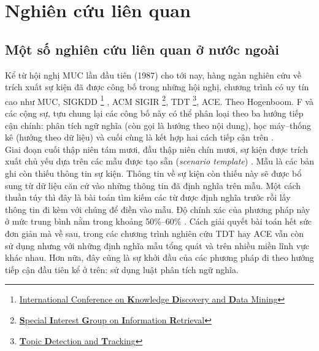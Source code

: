 \section{Nghiên cứu liên quan}
	\subsection{Một số nghiên cứu liên quan ở nước ngoài}
\noindent Kể từ hội nghị MUC lần đầu tiên (1987) cho tới nay, hàng ngàn nghiên cứu về trích xuất sự kiện đã được công bố trong những  hội nghị, chương trình có uy tín cao như MUC, SIGKDD \footnote{\href{http://www.kdd.org/}{International Conference on \textbf{K}nowledge \textbf{D}iscovery and \textbf{D}ata Mining}} , ACM SIGIR \footnote{\href{http://www.sigir.org/}{\textbf{S}pecial \textbf{I}nterest \textbf{G}roup on \textbf{I}nformation \textbf{R}etrieval}}, TDT \footnote{\href{http://projects.ldc.upenn.edu/TDT/}{\textbf{T}opic \textbf{D}etection and \textbf{T}racking}}, ACE. Theo Hogenboom. F và các cộng sự, tựu chung lại các công bố này có thể phân loại theo ba hướng tiếp cận chính: phân tích ngữ nghĩa (còn gọi là hướng theo nội dung), học máy--thống kê (hướng theo dữ liệu) và cuối cùng là kết hợp hai  cách tiếp cận trên \cite{FFU11}.
\\
\noindent Giai đoạn cuối thập niên tám mươi, đầu thập niên chín mươi, sự kiện được trích xuất chủ yếu dựa trên các mẫu được tạo sẵn (\emph{scenario template}) \cite{BS92}. Mẫu là các bản ghi còn thiếu thông tin sự kiện. Thông tin về sự kiện còn thiếu  này sẽ được bổ sung từ dữ liệu căn cứ vào những thông tin đã định nghĩa trên mẫu. Một cách thuần túy thì đây là bài toán tìm kiếm các từ được định nghĩa trước rồi lấy thông tin đi kèm với chúng để điền vào mẫu. Độ chính xác của phương pháp này ở mức trung bình nằm trong khoảng 50$\%$--60$\%$ \cite{MW11}. Cách giải quyết bài toán hết sức đơn giản mà về sau, trong các chương trình nghiên cứu TDT hay ACE vẫn còn sử dụng nhưng với những định nghĩa mẫu tổng quát và trên nhiều miền lĩnh vực khác nhau. Hơn nữa, đây cũng là sự khởi đầu của các phương pháp đi theo hướng tiếp cận đầu tiên kể ở trên: sử dụng luật phân tích ngữ nghĩa.
\\
